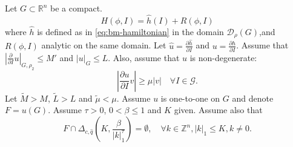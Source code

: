 \begin{lemma}\label{lemma:inductive}
Let $G \subset \mathbb{R}^n$ be a compact.
$$H(\phi,I)=\hat h(I) + R(\phi,I)$$
 where $\hat h$ is defined as in \ref{eq:bm-hamiltonian} in the domain $\mathcal{D}_\rho(G)$,and $R(\phi,I)$ analytic on the same domain.
Let $\hat u = \frac{\partial \hat h}{\partial I}$ and $u = \frac{\partial h}{\partial I}$. Assume that $|\frac{\partial}{\partial I} u|_{G,\rho_2} \leq M'$ and $|u|_G \leq L$. Also, assume that $u$ is non-degenerate:
$$\left|\frac{\partial u}{\partial I}v\right| \geq \mu|v| \quad \forall I \in \mathcal{G}.$$
Let $\tilde M > M$, $\tilde L > L$ and $\tilde \mu < \mu$.
Assume $u$ is one-to-one on $G$ and denote $F = u(G)$. Assume $\tau > 0$, $0 < \beta \leq 1$ and $K$ given. Assume also that
$$F\cap \Delta_{c,\hat q}\left(K,\frac{\beta}{|k|_1^\tau}\right) = \emptyset, \quad \forall k \in \mathbb{Z}^n,|k|_1 \leq K, k\neq0.$$


\end{lemma}
